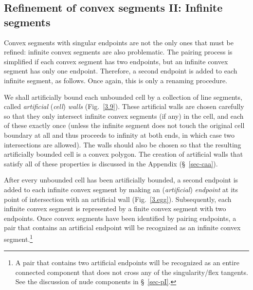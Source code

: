 
\subsection{Refinement of convex segments II: Infinite segments}
\label{sec-refine2}

Convex segments with singular endpoints are not the only ones that must
be refined: infinite convex segments are also problematic.
The pairing process is simplified if each convex segment has two endpoints,
but an infinite convex segment has only one endpoint.
Therefore, a second endpoint is added to each infinite segment, as follows.
Once again, this is only a renaming procedure.


We shall artificially bound each unbounded cell by a collection of 
line segments,
called {\em artificial} ({\em cell}) {\em walls} (Fig.~\ref{3.9}).
These artificial walls are chosen carefully so that they only intersect 
infinite convex segments (if any) in the cell, and each of these 
exactly once 
(unless the infinite segment does not touch the original cell boundary 
at all
and thus proceeds
to infinity at both ends, in which case two intersections are allowed).
The walls should also be chosen so that the resulting artificially bounded 
cell 
is a convex polygon.
The creation of artificial walls that satisfy all of these properties
is discussed in the Appendix (\S~\ref{sec-caa}).

After every unbounded cell has been artificially bounded, a second endpoint
is added to each infinite convex segment by making an 
({\em artificial}) {\em endpoint} 
at its point of intersection with an artificial wall (Fig.~\ref{3.egg}).
Subsequently, each infinite convex segment is represented by a finite convex
segment with two endpoints.
Once convex segments have been identified by pairing endpoints, 
a pair that contains an artificial endpoint will be recognized as an 
infinite convex 
segment.\footnote{A pair that contains two artificial endpoints will be 
	recognized as 
	an entire connected component that does not cross any of 
	the singularity/flex 
	tangents. See the discussion of nude components in \S~\ref{sec-pI}.}

